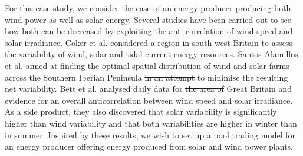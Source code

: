 For this case study, we consider the case of an energy producer producing both wind power as well as solar energy. Several studies have been carried out to see how both   can be decreased by exploiting the anti-correlation of wind speed and solar irradiance. Coker et al. \cite{Coker2013} considered a region in south-west Britain to assess the variability of wind, solar and tidal current energy resources. Santos-Alamillos et al. \cite{Santos-Alamillos} aimed at finding the optimal spatial distribution of wind and solar farms across the Southern Iberian Peninsula \sout{in an attempt} to minimise the resulting net variability. Bett et al. \cite{BETT16} analysed daily data for \sout{the area of} Great Britain and   evidence for an overall anticorrelation between wind speed and solar irradiance. As a side product, they also discovered that solar variability is significantly higher than wind variability and that both variabilities are higher in winter than in summer. Inspired by these results, we wish to set up a pool trading model for an energy producer offering energy produced from solar and wind power plants.  

